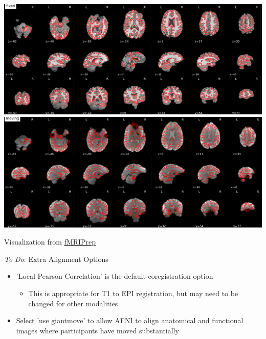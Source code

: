 \documentclass[t,12pt]{beamer}
\begin{document}
\begin{frame}{}
\vspace{10pt}
\centering
\includegraphics[width=.85\textwidth]{images/fixed_coreg.png} \\
\vspace{4pt}
\includegraphics[width=.85\textwidth]{images/moving_coreg.png} \\
\vspace{-10pt}
\begin{block}{}
Visualization from \href{http://fmriprep.readthedocs.io/en/stable/}{fMRIPrep}
\end{block}
\end{frame}

\begin{frame}{\emph{To Do}: Extra Alignment Options}
\vspace{10pt}
\begin{itemize}
\setlength\itemsep{1em}
\item 'Local Pearson Correlation' is the default coregistration option
\vspace{4pt}
\begin{itemize}
\item This is appropriate for T1 to EPI registration, but may need to be changed for other modalities
\end{itemize}
\item Select 'use giant\textunderscore{}move' to allow AFNI to align anatomical and functional images where participants have moved substantially
\end{itemize}
\end{frame}
\end{document}
